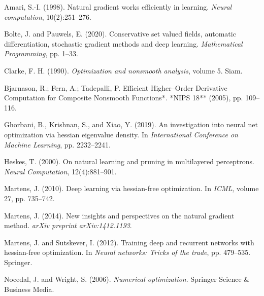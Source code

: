 \documentclass[11pt]{article}
\begin{document}

\begin{thebibliography}{10}
  Amari, S.-I. (1998).
  \newblock Natural gradient works efficiently in learning.
  \newblock \textit{Neural computation}, 10(2):251--276.

  Bolte, J. and Pauwels, E. (2020).
  \newblock Conservative set valued fields, automatic differentiation, stochastic gradient methods and deep learning.
  \newblock \textit{Mathematical Programming}, pp. 1--33.

  Clarke, F. H. (1990).
  \newblock \textit{Optimization and nonsmooth analysis}, volume 5.
  \newblock Siam.

  Bjarnason, R.; Fern, A.; Tadepalli, P.
  \newblock *Efficient Higher–Order Derivative Computation for Composite Nonsmooth Functions*.
  \newblock **NIPS 18** (2005), pp. 109–116.

  Ghorbani, B., Krishnan, S., and Xiao, Y. (2019).
  \newblock An investigation into neural net optimization via hessian eigenvalue density.
  \newblock In \textit{International Conference on Machine Learning}, pp. 2232--2241.

  Heskes, T. (2000).
  \newblock On natural learning and pruning in multilayered perceptrons.
  \newblock \textit{Neural Computation}, 12(4):881--901.

  Martens, J. (2010).
  \newblock Deep learning via hessian-free optimization.
  \newblock In \textit{ICML}, volume 27, pp. 735--742.

  Martens, J. (2014).
  \newblock New insights and perspectives on the natural gradient method.
  \newblock \textit{arXiv preprint arXiv:1412.1193}.

  Martens, J. and Sutskever, I. (2012).
  \newblock Training deep and recurrent networks with hessian-free optimization.
  \newblock In \textit{Neural networks: Tricks of the trade}, pp. 479--535. Springer.

  Nocedal, J. and Wright, S. (2006).
  \newblock \textit{Numerical optimization}.
  \newblock Springer Science \& Business Media.


\end{thebibliography}
\end{document}
